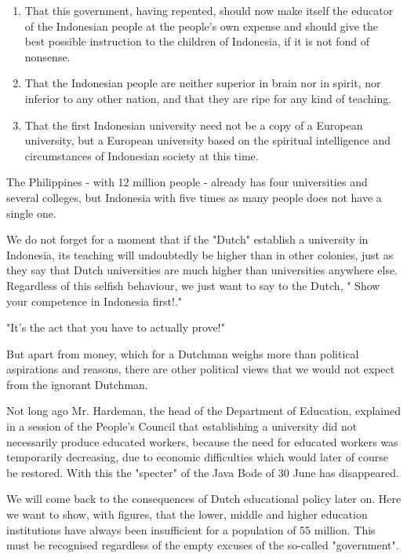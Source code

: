\begin{enumerate}
    \item That this government, having repented, should now make itself the educator of the Indonesian people at the people's own expense and should give the best possible instruction to the children of Indonesia, if it is not fond of nonsense.
    \item That the Indonesian people are neither superior in brain nor in spirit, nor inferior to any other nation, and that they are ripe for any kind of teaching.
    \item That the first Indonesian university need not be a copy of a European university, but a European university based on the spiritual intelligence and circumstances of Indonesian society at this time.
\end{enumerate}

The Philippines - with 12 million people - already has four universities and several colleges, 
but Indonesia with five times as many people does not have a single one.\vskip 0.2in

We do not forget for a moment that if the "Dutch" establish a university in 
Indonesia, its teaching will undoubtedly be higher than in other colonies, 
just as they say that Dutch universities are much higher than universities 
anywhere else. Regardless of this selfish behaviour, we just want to say to the Dutch, " Show your competence in Indonesia first!."\vskip 0.2in

"It's the act that you have to actually prove!"

But apart from money, which for a Dutchman weighs more than political aspirations and reasons, 
there are other political views that we would not expect from the ignorant Dutchman.\vskip 0.2in

Not long ago Mr. Hardeman, the head of the Department of Education, explained in a session 
of the People's Council that establishing a university did not necessarily produce educated 
workers, because the need for educated workers was temporarily decreasing, due to economic 
difficulties which would later of course be restored. With this the "specter" of the Java Bode of 30 June has disappeared.\vskip 0.2in

We will come back to the consequences of Dutch educational policy later on. Here we want to 
show, with figures, that the lower, middle and higher education institutions have always 
been insufficient for a population of 55 million. This must be recognised regardless of 
the empty excuses of the so-called "government".\vskip 0.2in

